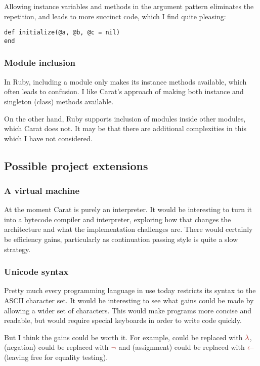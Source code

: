 Allowing instance variables and methods in the argument pattern eliminates the repetition, and leads to more succinct code, which I find quite pleasing:

\begin{lstlisting}
def initialize(@a, @b, @c = nil)
end
\end{lstlisting}

\subsubsection{Module inclusion}

In Ruby, including a module only makes its instance methods available, which often leads to confusion. I like Carat's approach of making both instance and singleton (class) methods available.

On the other hand, Ruby supports inclusion of modules inside other modules, which Carat does not. It may be that there are additional complexities in this which I have not considered.

\subsection{Possible project extensions}

\subsubsection{A virtual machine}

At the moment Carat is purely an interpreter. It would be interesting to turn it into a bytecode compiler and interpreter, exploring how that changes the architecture and what the implementation challenges are. There would certainly be efficiency gains, particularly as continuation passing style is quite a slow strategy.

\subsubsection{Unicode syntax}

Pretty much every programming language in use today restricts its syntax to the ASCII character set. It would be interesting to see what gains could be made by allowing a wider set of characters. This would make programs more concise and readable, but would require special keyboards in order to write code quickly.

But I think the gains could be worth it. For example,  could be replaced with $\color{Mahogany} \lambda$, \code{!} (negation) could be replaced with $\color{Mahogany} \neg$ and \code{=} (assignment) could be replaced with $\color{Mahogany} \leftarrow$ (leaving \code{=} free for equality testing).

